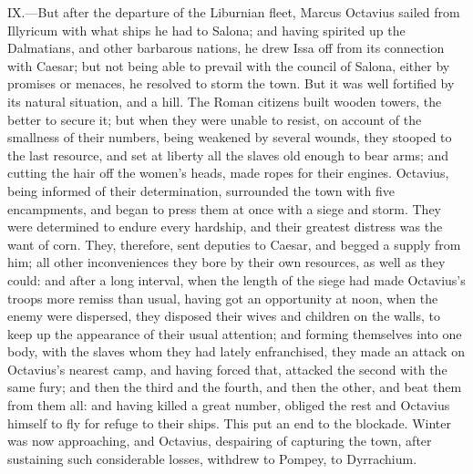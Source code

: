 IX.—But after the departure of the Liburnian fleet, Marcus Octavius
sailed from Illyricum with what ships he had to Salona; and having
spirited up the Dalmatians, and other barbarous nations, he drew Issa
off from its connection with Caesar; but not being able to prevail with
the council of Salona, either by promises or menaces, he resolved to
storm the town. But it was well fortified by its natural situation, and
a hill. The Roman citizens built wooden towers, the better to secure it;
but when they were unable to resist, on account of the smallness of
their numbers, being weakened by several wounds, they stooped to the
last resource, and set at liberty all the slaves old enough to bear
arms; and cutting the hair off the women's heads, made ropes for their
engines. Octavius, being informed of their determination, surrounded the
town with five encampments, and began to press them at once with a siege
and storm. They were determined to endure every hardship, and their
greatest distress was the want of corn. They, therefore, sent deputies
to Caesar, and begged a supply from him; all other inconveniences they
bore by their own resources, as well as they could: and after a long
interval, when the length of the siege had made Octavius's troops more
remiss than usual, having got an opportunity at noon, when the enemy
were dispersed, they disposed their wives and children on the walls, to
keep up the appearance of their usual attention; and forming themselves
into one body, with the slaves whom they had lately enfranchised, they
made an attack on Octavius's nearest camp, and having forced that,
attacked the second with the same fury; and then the third and the
fourth, and then the other, and beat them from them all: and having
killed a great number, obliged the rest and Octavius himself to fly for
refuge to their ships. This put an end to the blockade. Winter was now
approaching, and Octavius, despairing of capturing the town, after
sustaining such considerable losses, withdrew to Pompey, to Dyrrachium.

